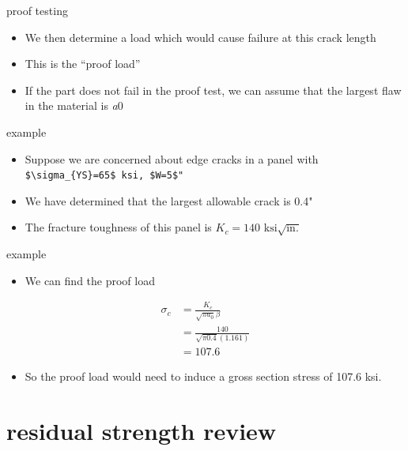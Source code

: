 \documentclass[
  letterpaper,
  ignorenonframetext,
  aspectratio=43,
  handout,
  12pt]{beamer}
\providecommand{\tightlist}{%
  \setlength{\itemsep}{0pt}\setlength{\parskip}{0pt}}
\providecommand{\tightlist}{%
\setlength{\itemsep}{0pt}\setlength{\parskip}{0pt}}
\begin{document}
\begin{frame}{proof testing}
\protect\hypertarget{proof-testing-2}{}
\begin{itemize}
\tightlist
\item
  We then determine a load which would cause failure at this crack
  length
\item
  This is the ``proof load''
\item
  If the part does not fail in the proof test, we can assume that the
  largest flaw in the material is \emph{a}0
\end{itemize}
\end{frame}

\begin{frame}[fragile]{example}
\protect\hypertarget{example}{}
\begin{itemize}
\tightlist
\item
  Suppose we are concerned about edge cracks in a panel with
  \texttt{\$\textbackslash{}sigma\_\{YS\}=65\$\ ksi,\ \$W=5\$"}
\item
  We have determined that the largest allowable crack is 0.4"
\item
  The fracture toughness of this panel is
  \(K_c = 140 \text{ ksi} \sqrt{\text{in.}}\)
\end{itemize}
\end{frame}

\begin{frame}{example}
\protect\hypertarget{example-1}{}
\begin{itemize}
\tightlist
\item
  We can find the proof load
\end{itemize}

\[\begin{aligned}
  \sigma_c &= \frac{K_c}{\sqrt{\pi a_0} \beta}\\
  &= \frac{140}{\sqrt{\pi 0.4} (1.161)}\\
  &= 107.6
\end{aligned}\]

\begin{itemize}
\tightlist
\item
  So the proof load would need to induce a gross section stress of 107.6
  ksi.
\end{itemize}
\end{frame}

\hypertarget{residual-strength-review}{%
\section{residual strength review}\label{residual-strength-review}}
\end{document}
